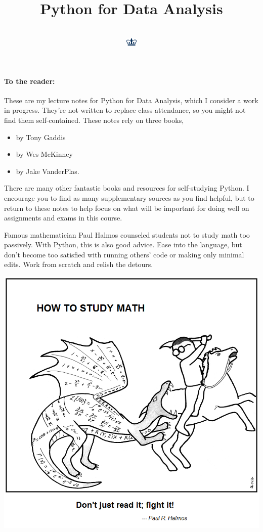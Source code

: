 \documentclass[11pt]{article}
\title{Python for Data Analysis \\ \scalebox{0.62}{Lecture Notes}}
\date{}
\author{\scalebox{0.81}{\link{https://github.com/alexanderthclark}{\instructor}} \\
	{\includegraphics[width = 0.51cm]{crown_dark.png}} \\
  	{\scalebox{0.73}{\centering\emph{Columbia University SPS}}} }
\begin{document}
\maketitle


\paragraph{To the reader:} These are my lecture notes for Python for Data Analysis, which I consider a work in progress. They're not written to replace class attendance, so you might not find them self-contained. These notes rely on three books,
\begin{itemize}
    \item \textit{} by Tony Gaddis
    \item \textit{} by Wes McKinney
    \item \textit{} by Jake VanderPlas.
\end{itemize}
There are many other fantastic books and resources for self-studying Python. I encourage you to find as many supplementary sources as you find helpful, but to return to these notes to help focus on what will be important for doing well on assignments and exams in this course.

Famous mathematician Paul Halmos counseled students not to study math too passively. With Python, this is also good advice. Ease into the language, but don't become too satisfied with running others' code or making only minimal edits. Work from scratch and relish the detours. 

\begin{center}
\href{https://abstrusegoose.com/353}{\includegraphics[width = .53\textwidth]{HowMath.png}}

\vspace{-6pt}
\end{center}
\end{document}
